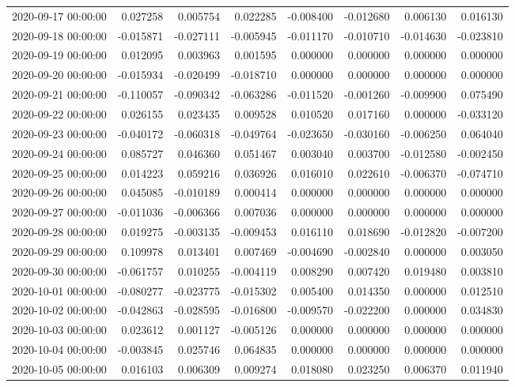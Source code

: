 \begin{tabular}{lrrrrrrr}
2020-09-17 00:00:00 & 0.027258 & 0.005754 & 0.022285 & -0.008400 & -0.012680 & 0.006130 & 0.016130 \\
2020-09-18 00:00:00 & -0.015871 & -0.027111 & -0.005945 & -0.011170 & -0.010710 & -0.014630 & -0.023810 \\
2020-09-19 00:00:00 & 0.012095 & 0.003963 & 0.001595 & 0.000000 & 0.000000 & 0.000000 & 0.000000 \\
2020-09-20 00:00:00 & -0.015934 & -0.020499 & -0.018710 & 0.000000 & 0.000000 & 0.000000 & 0.000000 \\
2020-09-21 00:00:00 & -0.110057 & -0.090342 & -0.063286 & -0.011520 & -0.001260 & -0.009900 & 0.075490 \\
2020-09-22 00:00:00 & 0.026155 & 0.023435 & 0.009528 & 0.010520 & 0.017160 & 0.000000 & -0.033120 \\
2020-09-23 00:00:00 & -0.040172 & -0.060318 & -0.049764 & -0.023650 & -0.030160 & -0.006250 & 0.064040 \\
2020-09-24 00:00:00 & 0.085727 & 0.046360 & 0.051467 & 0.003040 & 0.003700 & -0.012580 & -0.002450 \\
2020-09-25 00:00:00 & 0.014223 & 0.059216 & 0.036926 & 0.016010 & 0.022610 & -0.006370 & -0.074710 \\
2020-09-26 00:00:00 & 0.045085 & -0.010189 & 0.000414 & 0.000000 & 0.000000 & 0.000000 & 0.000000 \\
2020-09-27 00:00:00 & -0.011036 & -0.006366 & 0.007036 & 0.000000 & 0.000000 & 0.000000 & 0.000000 \\
2020-09-28 00:00:00 & 0.019275 & -0.003135 & -0.009453 & 0.016110 & 0.018690 & -0.012820 & -0.007200 \\
2020-09-29 00:00:00 & 0.109978 & 0.013401 & 0.007469 & -0.004690 & -0.002840 & 0.000000 & 0.003050 \\
2020-09-30 00:00:00 & -0.061757 & 0.010255 & -0.004119 & 0.008290 & 0.007420 & 0.019480 & 0.003810 \\
2020-10-01 00:00:00 & -0.080277 & -0.023775 & -0.015302 & 0.005400 & 0.014350 & 0.000000 & 0.012510 \\
2020-10-02 00:00:00 & -0.042863 & -0.028595 & -0.016800 & -0.009570 & -0.022200 & 0.000000 & 0.034830 \\
2020-10-03 00:00:00 & 0.023612 & 0.001127 & -0.005126 & 0.000000 & 0.000000 & 0.000000 & 0.000000 \\
2020-10-04 00:00:00 & -0.003845 & 0.025746 & 0.064835 & 0.000000 & 0.000000 & 0.000000 & 0.000000 \\
2020-10-05 00:00:00 & 0.016103 & 0.006309 & 0.009274 & 0.018080 & 0.023250 & 0.006370 & 0.011940 \\

\end{tabular}
